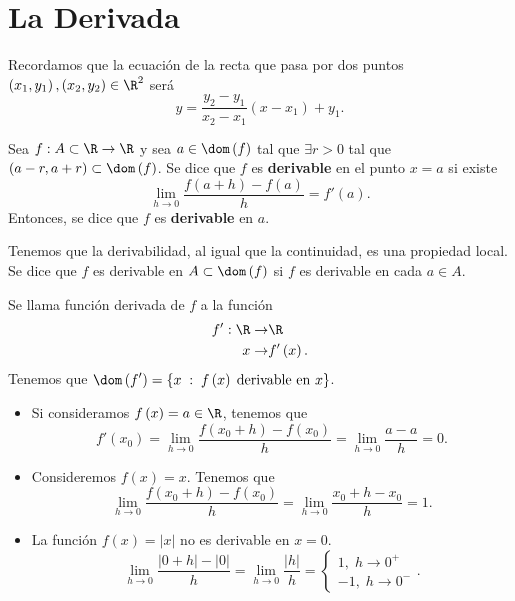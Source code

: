 \chapter{La Derivada}
Recordamos que la ecuación de la recta que pasa por dos puntos $\displaystyle \left(x_{1}, y_{1}\right), \left(x_{2}, y_{2}\right) \in \R^{2} $ será
\[ y = \frac{y_{2}-y_{1}}{x_{2}-x_{1}}\left(x - x_{1}\right) + y_{1} .\]
\begin{fdefinition}[Derivada]
\normalfont Sea $\displaystyle f : A \subset \R \to \R $ y sea $\displaystyle a \in \dom\left(f\right) $ tal que $\displaystyle \exists r > 0 $ tal que $\displaystyle \left(a-r, a + r\right) \subset \dom\left(f\right) $. Se dice que $\displaystyle f $ es \textbf{derivable} en el punto $\displaystyle x = a $ si existe 
\[\lim_{h \to 0}\frac{f\left(a + h\right)-f\left(a\right)}{h} = f'\left(a\right) .\]
Entonces, se dice que $\displaystyle f $ es \textbf{derivable} en $\displaystyle a $. 
\end{fdefinition}
\begin{observation}
\normalfont Tenemos que la derivabilidad, al igual que la continuidad, es una propiedad local. Se dice que $\displaystyle f $ es derivable en $\displaystyle A \subset \dom\left(f\right) $ si $\displaystyle f $ es derivable en cada $\displaystyle a \in A $.
\end{observation}
\begin{observation}
\normalfont 
Se llama función derivada de $\displaystyle f $ a la función 
\[
\begin{split}
	f' : \R \to & \R \\
	x \to & f'\left(x\right).
\end{split}
\]
Tenemos que $\displaystyle \dom\left(f'\right) = \left\{ x \; : \; f\left(x\right) \; \text{derivable en }x\right\}  $.
\end{observation}
\begin{eg}
\normalfont 
\begin{itemize}
\item Si consideramos $\displaystyle f\left(x\right) = a \in \R $, tenemos que 
	\[f'\left(x_{0}\right) = \lim_{h \to 0}\frac{f\left(x_{0}+h\right)-f\left(x_{0}\right)}{h} = \lim_{h \to 0}\frac{a - a}{h} = 0 .\]
\item Consideremos $\displaystyle f\left(x\right) = x $. Tenemos que
	\[\lim_{h \to 0}\frac{f\left(x_{0}+h\right)-f\left(x_{0}\right)}{h} = \lim_{h \to 0}\frac{x_{0}+h-x_{0}}{h} = 1 .\]
\item La función $\displaystyle f\left(x\right) = \left|x\right| $ no es derivable en $\displaystyle x = 0 $.
	\[ \lim_{h \to 0}\frac{ \left|0 + h\right|- \left|0\right|}{h} = \lim_{h \to 0}\frac{ \left|h\right|}{h} = 
	\begin{cases}
	1, \; h \to 0 ^{+} \\
	-1, \; h \to 0^{-}
	\end{cases}
	.\]
\end{itemize}
\end{eg}
